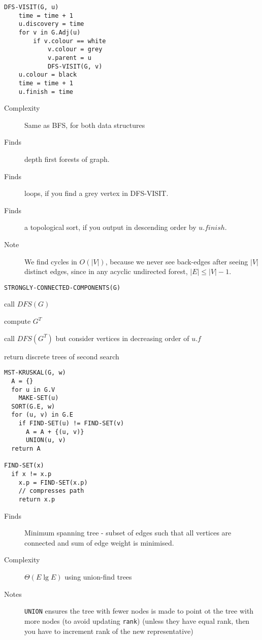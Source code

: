 \documentclass[10pt, a4paper,landscape]{article}
\begin{document}
\begin{multicols*}{4}
\begin{lstlisting}
DFS-VISIT(G, u)
    time = time + 1
    u.discovery = time
    for v in G.Adj(u)
        if v.colour == white
            v.colour = grey
            v.parent = u
            DFS-VISIT(G, v)
    u.colour = black
    time = time + 1
    u.finish = time
\end{lstlisting}
\begin{description}
    \item[Complexity] Same as BFS, for both data structures
    \item[Finds] depth first forests of graph.
    \item[Finds] loops, if you find a grey vertex in DFS-VISIT.
    \item[Finds] a topological sort, if you output in descending order by $u.finish$.
    \item[Note] We find cycles in $O(|V|)$, because we never see back-edges after seeing $|V|$ distinct edges, since in any acyclic undirected forest, $|E| \leq |V| - 1$. 
\end{description}

\begin{lstlisting}
STRONGLY-CONNECTED-COMPONENTS(G)
\end{lstlisting}
\begin{compactitem}
    \item call $DFS(G)$
    \item compute $G^T$
    \item call $DFS(G^T)$ but consider vertices in
        decreasing order of $u.f$
    \item return discrete trees of second search
\end{compactitem}

\begin{lstlisting}
MST-KRUSKAL(G, w)
  A = {}
  for u in G.V
    MAKE-SET(u)
  SORT(G.E, w)
  for (u, v) in G.E
    if FIND-SET(u) != FIND-SET(v)
      A = A + {(u, v)}
      UNION(u, v)
  return A

FIND-SET(x)
  if x != x.p
    x.p = FIND-SET(x.p) 
    // compresses path
    return x.p
\end{lstlisting}
\begin{description}
    \item[Finds] Minimum spanning tree - subset of edges such that all vertices are connected and sum of edge weight is minimised.
    \item[Complexity] $\Theta(E\lg{E})$ using union-find trees
    \item[Notes] \texttt{UNION} ensures the tree with fewer nodes is made to point ot the tree with more nodes (to avoid updating \texttt{rank}) (unless they have equal rank, then you have to increment rank of the new representative)
\end{description}


\end{multicols*}
\end{document}
